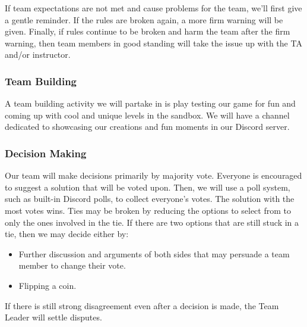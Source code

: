 \documentclass{article}
\begin{document}
If team expectations are not met and cause problems for the team, we'll first give a gentle reminder. If the rules are broken again, a more firm warning will be given. Finally, if rules continue to be broken and harm the team after the firm warning, then team members in good standing will take the issue up with the TA and/or instructor.


\subsubsection*{Team Building}

A team building activity we will partake in is play testing our game for fun and coming up with cool and unique levels in the sandbox. We will have a channel dedicated to showcasing our creations and fun moments in our Discord server.

\subsubsection*{Decision Making} 

Our team will make decisions primarily by majority vote. Everyone is encouraged to suggest a solution that will be voted upon. Then, we will use a poll system, such as built-in Discord polls, to collect everyone's votes. The solution with the most votes wins.
Ties may be broken by reducing the options to select from to only the ones involved in the tie. If there are two options that are still stuck in a tie, then we may decide either by:
\begin{itemize}
\item{Further discussion and arguments of both sides that may persuade a team member to change their vote.}
\item{Flipping a coin.}
\end{itemize}
If there is still strong disagreement even after a decision is made, the Team Leader will settle disputes.
\end{document}
